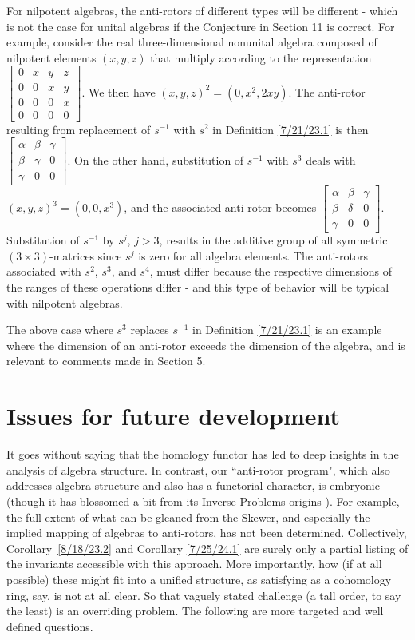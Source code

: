 \documentclass{amsart}
\numberwithin{equation}{section}
\theoremstyle{definition}
\numberwithin{theorem}{section}
\begin{document}
For nilpotent algebras, the anti-rotors of different types will be different - which is not the case for unital algebras if the Conjecture in Section 11 is correct.  For example, consider the real three-dimensional nonunital algebra composed of nilpotent elements $(x,y,z)$ that multiply according to the representation
  $ \left[
\begin{array}{ccccc}
0 & x & y & z  \\
0 & 0 & x & y \\
0 & 0 & 0 & x \\
0 & 0 & 0 & 0
\end{array}
\right] $.  We then have $(x,y,z)^2 = (0,x^2, 2xy)$.  The anti-rotor resulting from replacement of $s^{-1}$ with  $s^2$ in Definition \ref{7/21/23.1} is then $\left[
\begin{array}{ccccc}
\alpha & \beta & \gamma   \\
\beta & \gamma & 0 \\
\gamma & 0 & 0  
\end{array}
\right] $.  On the other hand, substitution of $s^{-1}$ with $s^3$  deals with $(x,y,z)^3 = (0,0, x^3)$, and the associated anti-rotor becomes $\left[
\begin{array}{ccccc}
\alpha & \beta & \gamma   \\
\beta & \delta & 0 \\
\gamma & 0 & 0  
\end{array}
\right] $.  Substitution of $s^{-1}$ by $s^j$, $j>3$, results in the additive group of all symmetric $(3\times 3)$-matrices since $s^j$ is zero for all algebra elements.  The anti-rotors associated with $s^2$, $s^3$, and $s^4$, must differ because the respective dimensions of the ranges of these operations differ - and this type of behavior will be typical with nilpotent algebras.  
 
The above case where $s^3$ replaces $s^{-1}$ in Definition \ref{7/21/23.1} is an example where the dimension of an anti-rotor exceeds the dimension of the algebra, and is relevant to comments made in Section 5.



\section{Issues for future development} 
It goes without saying that the homology functor has led to deep insights in the analysis of algebra structure.  In contrast, our ``anti-rotor program", which also addresses algebra structure and also has a functorial character, is embryonic  (though it has blossomed a bit from its Inverse Problems origins \cite{fgreensite:2022d}).  For example, the full extent of what can be gleaned from the Skewer, and especially the implied mapping of algebras to anti-rotors, has not been determined.  Collectively, \mbox{Corollary \ref{8/18/23.2}} and Corollary \ref{7/25/24.1} are surely only a partial listing of the invariants accessible with this approach.  More importantly, how (if at all possible) these might fit into a unified structure, as satisfying as a cohomology ring, say, is not at all clear.  So that vaguely stated challenge (a tall order, to say the least) is an overriding problem.  The following are more targeted and well defined questions.
 
\end{document}
